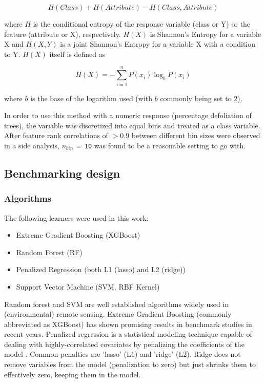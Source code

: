 \documentclass[peerreview]{IEEEtran}
\begin{document}
\begin{equation}
	H(Class) + H(Attribute) - H(Class, Attribute)
\end{equation}

where \(H\) is the conditional entropy of the response variable (class or Y) or the feature (attribute or X), respectively.
$H(X)$ is Shannon's Entropy \cite{shannon1948} for a variable X and $H(X, Y)$ is a joint Shannon's Entropy for a variable X with a condition to Y.
$H(X)$ itself is defined as

\begin{equation}
	H(X) = - \sum_{i=1}^{n} P(x_i)\log_bP(x_i)
\end{equation}

where $b$ is the base of the logarithm used (with $b$ commonly being set to 2).

In order to use this method with a numeric response (percentage defoliation of trees), the variable was discretized into equal bins and treated as a class variable.
After feature rank correlations of $> 0.9$ between different bin sizes were observed in a side analysis, \texttt{\(n_{bin}\) = 10} was found to be a reasonable setting to go with.

\subsection{Benchmarking design}

\subsubsection{Algorithms}

The following learners were used in this work:

\begin{itemize}
	\item  Extreme Gradient Boosting (XGBoost)
	\item  Random Forest (RF)
	\item  Penalized Regression (both L1 (lasso) and L2 (ridge))
	\item  Support Vector Machine (SVM, RBF Kernel)
\end{itemize}

Random forest and {SVM} are well established algorithms widely used in (environmental) remote sensing.
Extreme Gradient Boosting (commonly abbreviated as XGBoost) has shown promising results in benchmark studies in recent years.
Penalized regression is a statistical modeling technique capable of dealing with highly-correlated covariates by penalizing the coefficients of the model \cite{hastie2001}.
Common penalties are 'lasso' (L1) and 'ridge' (L2).
Ridge does not remove variables from the model (penalization to zero) but just shrinks them to effectively zero, keeping them in the model.
\end{document}
